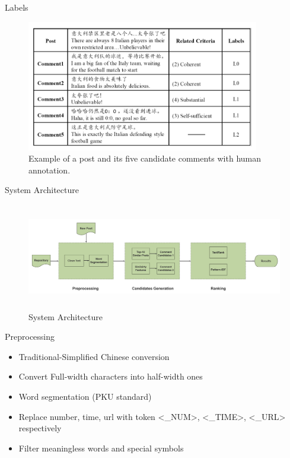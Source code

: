 \documentclass[aspectratio=169]{beamer} %
\begin{document}
    \begin{frame}{Labels}
      \begin{center}
        \begin{figure}
        \includegraphics[width=4in,height=2.25in]{stc-labels.png}
        \caption{Example of a post and its five candidate comments with human annotation. }
        \end{figure}
      \end{center}
    \end{frame}

    \begin{frame}{System Architecture}
      \begin{figure}
      \includegraphics[width=14cm,height=4.63cm]{stc-flow-big.png}
      \caption{System Architecture}
      \end{figure}
    \end{frame}

    \begin{frame}{Preprocessing}
      \begin{itemize}
        \item Traditional-Simplified Chinese conversion
        \item Convert Full-width characters into half-width ones
        \item Word segmentation (PKU standard)
        \item Replace number, time, url with token <\_NUM>, <\_TIME>, <\_URL> respectively
        \item Filter meaningless words and special symbols
      \end{itemize}
    \end{frame}
\end{document}
